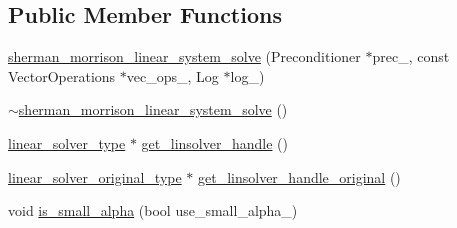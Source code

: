 \subsection*{Public Member Functions}
\begin{DoxyCompactItemize}
\item 
\hyperlink{classnumerical__algos_1_1sherman__morrison__linear__system_1_1sherman__morrison__linear__system__solve_aa599b0ec2377f2516a2cd5c13575b0ae}{sherman\-\_\-morrison\-\_\-linear\-\_\-system\-\_\-solve} (Preconditioner $\ast$prec\-\_\-, const Vector\-Operations $\ast$vec\-\_\-ops\-\_\-, Log $\ast$log\-\_\-)
\item 
\hyperlink{classnumerical__algos_1_1sherman__morrison__linear__system_1_1sherman__morrison__linear__system__solve_a95929acb846fadaf4f5903691691bbbf}{$\sim$sherman\-\_\-morrison\-\_\-linear\-\_\-system\-\_\-solve} ()
\item 
\hyperlink{classnumerical__algos_1_1sherman__morrison__linear__system_1_1sherman__morrison__linear__system__solve_a0a05cc7927e440224dfdef6aeb93e4b7}{linear\-\_\-solver\-\_\-type} $\ast$ \hyperlink{classnumerical__algos_1_1sherman__morrison__linear__system_1_1sherman__morrison__linear__system__solve_abe9f6b5e40f3dde211278ce6db8a313a}{get\-\_\-linsolver\-\_\-handle} ()
\item 
\hyperlink{classnumerical__algos_1_1sherman__morrison__linear__system_1_1sherman__morrison__linear__system__solve_a863956a47581f9793061f860e0720b24}{linear\-\_\-solver\-\_\-original\-\_\-type} $\ast$ \hyperlink{classnumerical__algos_1_1sherman__morrison__linear__system_1_1sherman__morrison__linear__system__solve_a34c9fe8a5c9ba4bc95606203fc8d3fba}{get\-\_\-linsolver\-\_\-handle\-\_\-original} ()
\item 
void \hyperlink{classnumerical__algos_1_1sherman__morrison__linear__system_1_1sherman__morrison__linear__system__solve_a9924d186e34b35e7a29169d759ce041c}{is\-\_\-small\-\_\-alpha} (bool use\-\_\-small\-\_\-alpha\-\_\-)
\item 

\end{DoxyCompactItemize}
